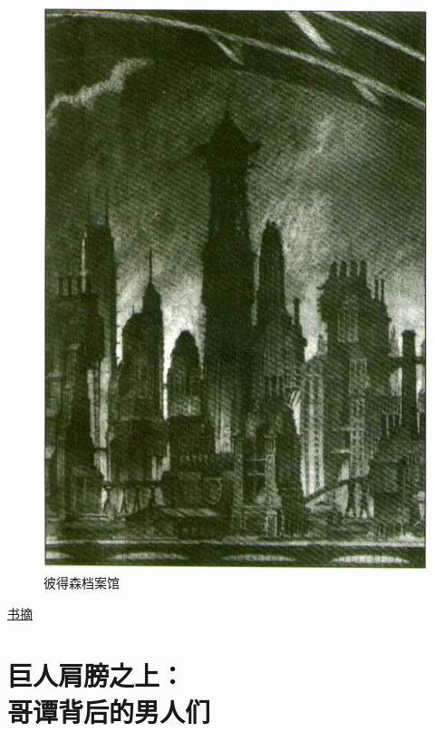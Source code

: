 \documentclass[9pt,openany]{extbook}
\begin{document}
\color{maincolor}
\pagestyle{mystyle}
\begin{multicols}{2}
    \setcounter{page}{52}
    \begin{figure}[H]
        \centering
        \includegraphics[width=\linewidth]{batman family history.png}
        \caption{\hfill\color{maincolor} 彼得森档案馆}
    \end{figure}

    \fangsong\noindent\LARGE\underline{书\quad 摘}\rmfamily\normalsize
    \vspace{-2pt}

    \section{巨人肩膀之上：\\哥谭背后的男人们}


\end{multicols}
\end{document}
